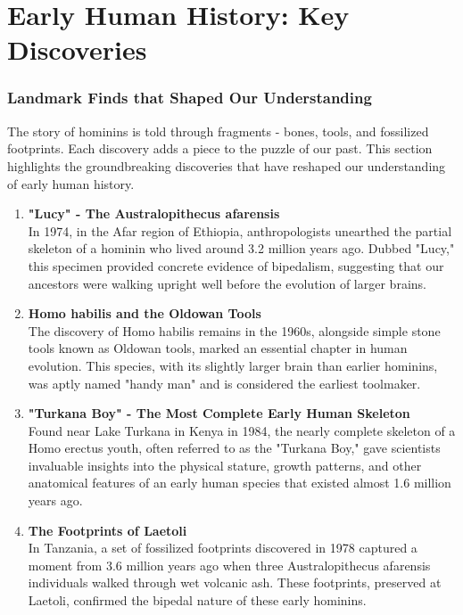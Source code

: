 \documentclass[a4paper,12pt]{book}
\begin{document}


\chapter{Early Human History: Key Discoveries}
\subsection*{Landmark Finds that Shaped Our Understanding}
The story of hominins is told through fragments - bones, tools, and fossilized footprints. Each discovery adds a piece to the puzzle of our past. This section highlights the groundbreaking discoveries that have reshaped our understanding of early human history.

\begin{enumerate}
    \item \textbf{"Lucy" - The Australopithecus afarensis} \\
    In 1974, in the Afar region of Ethiopia, anthropologists unearthed the partial skeleton of a hominin who lived around 3.2 million years ago. Dubbed "Lucy," this specimen provided concrete evidence of bipedalism, suggesting that our ancestors were walking upright well before the evolution of larger brains.

    \item \textbf{Homo habilis and the Oldowan Tools} \\
    The discovery of Homo habilis remains in the 1960s, alongside simple stone tools known as Oldowan tools, marked an essential chapter in human evolution. This species, with its slightly larger brain than earlier hominins, was aptly named "handy man" and is considered the earliest toolmaker.

    \item \textbf{"Turkana Boy" - The Most Complete Early Human Skeleton} \\
    Found near Lake Turkana in Kenya in 1984, the nearly complete skeleton of a Homo erectus youth, often referred to as the "Turkana Boy," gave scientists invaluable insights into the physical stature, growth patterns, and other anatomical features of an early human species that existed almost 1.6 million years ago.

    \item \textbf{The Footprints of Laetoli} \\
    In Tanzania, a set of fossilized footprints discovered in 1978 captured a moment from 3.6 million years ago when three Australopithecus afarensis individuals walked through wet volcanic ash. These footprints, preserved at Laetoli, confirmed the bipedal nature of these early hominins.


\end{enumerate}
\end{document}
